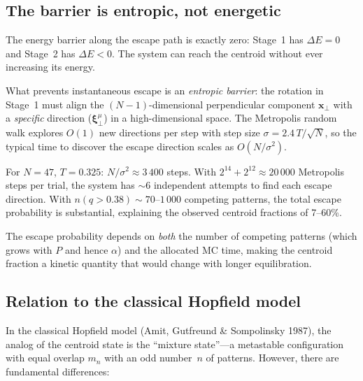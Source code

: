 \documentclass[11pt]{article}
\newcommand{\bxi}{\boldsymbol{\xi}}
\newcommand{\bx}{\mathbf{x}}
\begin{document}
\subsection{The barrier is entropic, not energetic}

The energy barrier along the escape path is exactly zero: Stage~1 has $\Delta E = 0$ and Stage~2 has $\Delta E < 0$.  The system can reach the centroid without ever increasing its energy.

What prevents instantaneous escape is an \emph{entropic barrier}: the rotation in Stage~1 must align the $(N\!-\!1)$-dimensional perpendicular component $\bx_\perp$ with a \emph{specific} direction ($\bxi^\mu_\perp$) in a high-dimensional space.  The Metropolis random walk explores $O(1)$ new directions per step with step size $\sigma = 2.4\,T/\!\sqrt{N}$, so the typical time to discover the escape direction scales as $O(N/\sigma^2)$.

For $N = 47$, $T = 0.325$: $N/\sigma^2 \approx 3\,400$ steps.  With $2^{14} + 2^{12} \approx 20\,000$ Metropolis steps per trial, the system has $\sim$6 independent attempts to find each escape direction.  With $n(q > 0.38) \sim 70$--$1\,000$ competing patterns, the total escape probability is substantial, explaining the observed centroid fractions of 7--60\%.

The escape probability depends on \emph{both} the number of competing patterns (which grows with $P$ and hence $\alpha$) and the allocated MC time, making the centroid fraction a kinetic quantity that would change with longer equilibration.

\subsection{Relation to the classical Hopfield model}

In the classical Hopfield model (Amit, Gutfreund \& Sompolinsky 1987), the analog of the centroid state is the ``mixture state''---a metastable configuration with equal overlap $m_n$ with an odd number~$n$ of patterns.  However, there are fundamental differences:
\end{document}
